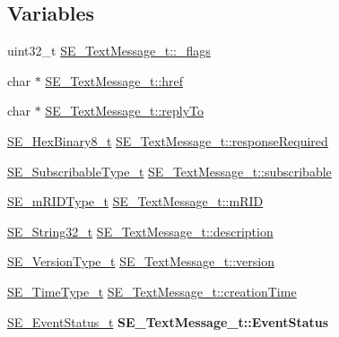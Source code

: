\subsection*{Variables}
\begin{DoxyCompactItemize}
\item 
uint32\+\_\+t \hyperlink{group__TextMessage_gaf629d5b9d66e6a1e00c8ffe32295eeef}{S\+E\+\_\+\+Text\+Message\+\_\+t\+::\+\_\+flags}
\item 
char $\ast$ \hyperlink{group__TextMessage_gabc820eedb6d1736d60a5f79c82dfbcd4}{S\+E\+\_\+\+Text\+Message\+\_\+t\+::href}
\item 
char $\ast$ \hyperlink{group__TextMessage_gaef01814e071285a1c298efe3d7f04ad8}{S\+E\+\_\+\+Text\+Message\+\_\+t\+::reply\+To}
\item 
\hyperlink{group__HexBinary8_gaecf2dab3615fb954a693c017a61f77d6}{S\+E\+\_\+\+Hex\+Binary8\+\_\+t} \hyperlink{group__TextMessage_gaef788047a5043fd8cdba5706dd69c868}{S\+E\+\_\+\+Text\+Message\+\_\+t\+::response\+Required}
\item 
\hyperlink{group__SubscribableType_ga5c41f553d369710ed34619266bf2551e}{S\+E\+\_\+\+Subscribable\+Type\+\_\+t} \hyperlink{group__TextMessage_gaac87d3ebb2b9b25e58bec8fe5d86b102}{S\+E\+\_\+\+Text\+Message\+\_\+t\+::subscribable}
\item 
\hyperlink{group__mRIDType_gac74622112f3a388a2851b2289963ba5e}{S\+E\+\_\+m\+R\+I\+D\+Type\+\_\+t} \hyperlink{group__TextMessage_ga48f143c96b8696ced14ce0ab1445f4dc}{S\+E\+\_\+\+Text\+Message\+\_\+t\+::m\+R\+ID}
\item 
\hyperlink{group__String32_gac9f59b06b168b4d2e0d45ed41699af42}{S\+E\+\_\+\+String32\+\_\+t} \hyperlink{group__TextMessage_gada927270875bfc2e7cb7fbd675168e86}{S\+E\+\_\+\+Text\+Message\+\_\+t\+::description}
\item 
\hyperlink{group__VersionType_ga4b8d27838226948397ed99f67d46e2ae}{S\+E\+\_\+\+Version\+Type\+\_\+t} \hyperlink{group__TextMessage_ga9101eb2e0eeca3eac5a47da06fb26423}{S\+E\+\_\+\+Text\+Message\+\_\+t\+::version}
\item 
\hyperlink{group__TimeType_ga6fba87a5b57829b4ff3f0e7638156682}{S\+E\+\_\+\+Time\+Type\+\_\+t} \hyperlink{group__TextMessage_ga26ae5914787c481dbbf7052be2087a2c}{S\+E\+\_\+\+Text\+Message\+\_\+t\+::creation\+Time}
\item 
\mbox{\label{group__TextMessage_ga12bfce9681a792726ab533c8c37d3ce0}} 
\hyperlink{structSE__EventStatus__t}{S\+E\+\_\+\+Event\+Status\+\_\+t} {\bfseries S\+E\+\_\+\+Text\+Message\+\_\+t\+::\+Event\+Status}

\end{DoxyCompactItemize}
